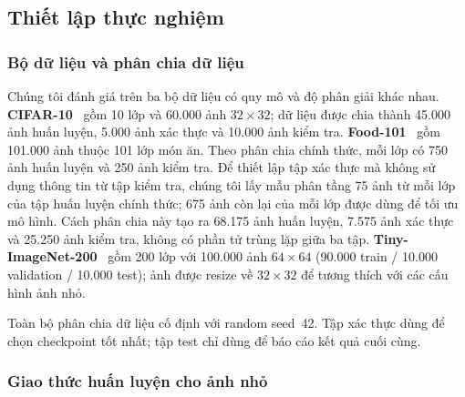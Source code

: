 \documentclass[conference]{IEEEtran}
\begin{document}
\subsection{Thiết lập thực nghiệm}

\subsubsection{Bộ dữ liệu và phân chia dữ liệu}

Chúng tôi đánh giá trên ba bộ dữ liệu có quy mô và độ phân giải khác
nhau. \textbf{CIFAR-10}~\cite{Krizhevsky2009Cifar} gồm 10 lớp và
60.000 ảnh $32\!\times\!32$; dữ liệu được chia thành 45.000 ảnh huấn
luyện, 5.000 ảnh xác thực và 10.000 ảnh kiểm tra.
\textbf{Food-101}~\cite{Bossard2014Food101} gồm 101.000 ảnh thuộc
101 lớp món ăn. Theo phân chia chính thức, mỗi lớp có 750 ảnh huấn
luyện và 250 ảnh kiểm tra. Để thiết lập tập xác thực mà không sử dụng
thông tin từ tập kiểm tra, chúng tôi lấy mẫu phân tầng 75 ảnh từ mỗi
lớp của tập huấn luyện chính thức; 675 ảnh còn lại của mỗi lớp được
dùng để tối ưu mô hình. Cách phân chia này tạo ra 68.175 ảnh huấn
luyện, 7.575 ảnh xác thực và 25.250 ảnh kiểm tra, không có phần tử
trùng lặp giữa ba tập.
\textbf{Tiny-ImageNet-200}~\cite{Le2015TinyImageNet} gồm 200 lớp với
100.000 ảnh $64\!\times\!64$ (90.000 train / 10.000 validation /
10.000 test); ảnh được resize về $32\!\times\!32$ để tương thích với
các cấu hình ảnh nhỏ.

Toàn bộ phân chia dữ liệu cố định với random seed~42. Tập xác thực dùng để chọn checkpoint tốt nhất; tập test chỉ dùng để báo cáo kết quả cuối cùng.

\subsubsection{Giao thức huấn luyện cho ảnh nhỏ}
\end{document}
